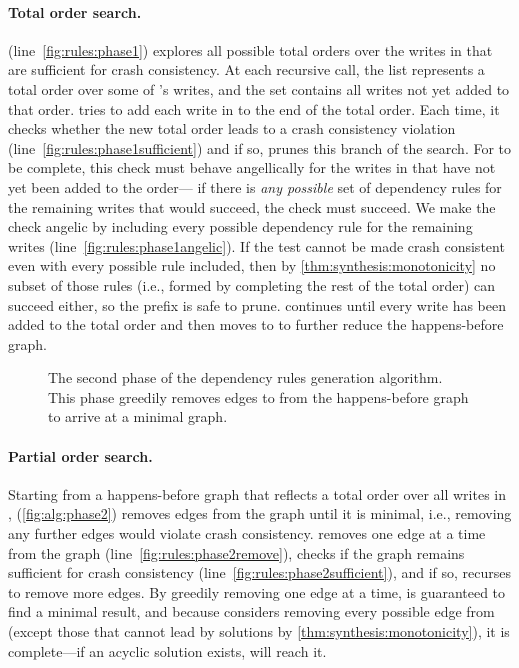 \paragraph{Total order search.}
\phaseone (line~\ref{fig:rules:phase1})
explores all possible total orders over the writes in \test
that are sufficient for crash consistency.
At each recursive call, the list \ord represents a total order over some of \test's writes,
and the set \wr contains all writes not yet added to that order.
\phaseone tries to add each write in \wr to the end of the total order.
Each time, it checks whether the new total order leads to a crash consistency violation (line~\ref{fig:rules:phase1sufficient})
and if so, prunes this branch of the search.
For \phaseone to be complete, 
this check must behave angellically for the writes in \wr that have not yet been added to the order---%
if there is \emph{any possible} set of dependency rules for the remaining writes that would succeed,
the check must succeed.
We make the check angelic by including every possible dependency rule for the remaining writes (line~\ref{fig:rules:phase1angelic}).
If the test cannot be made crash consistent even with every possible rule included,
then by \cref{thm:synthesis:monotonicity} no subset of those rules
(i.e., formed by completing the rest of the total order)
can succeed either, so the prefix is safe to prune.
\phaseone continues until every write has been added to the total order
and then moves to \phasetwo to further reduce the happens-before graph.\tighten

\begin{figure}
    \centering
    {}
    \caption{The second phase of the dependency rules generation algorithm. This phase
    greedily removes edges to from the happens-before graph to arrive at a minimal graph.}
    \label{fig:alg:phase2}
\end{figure}

\paragraph{Partial order search.}
Starting from a happens-before graph \gr that reflects a total order over all writes in \test,
\phasetwo (\autoref{fig:alg:phase2})
removes edges from the graph until it is minimal,
i.e., removing any further edges would violate crash consistency.
\phasetwo removes one edge at a time from the graph \gr (line~\ref{fig:rules:phase2remove}),
checks if the graph remains sufficient for crash consistency (line~\ref{fig:rules:phase2sufficient}),
and if so, recurses to remove more edges.
By greedily removing one edge at a time,
\phasetwo is guaranteed to find a minimal result,
and because \phasetwo considers removing every possible edge from \gr
(except those that cannot lead by solutions by \cref{thm:synthesis:monotonicity}),
it is complete---if an acyclic solution exists, \phasetwo will reach it.\tighten

